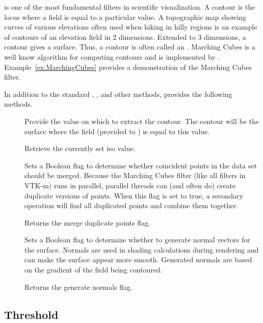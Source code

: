 is one of the most fundamental filters in scientific
visualization. A contour is the locus where a field is equal to a
particular value. A topographic map showing curves of various elevations
often used when hiking in hilly regions is an example of contours of an
elevation field in 2 dimensions. Extended to 3 dimensions, a contour gives
a surface. Thus, a contour is often called an .
Marching Cubes is a well know algorithm for computing contours and is
implemented by . Example~\ref{ex:MarchingCubes}
provides a demonstration of the Marching Cubes filter.

In addition to the standard ,
, and other methods,
 provides the following methods.

\begin{description}
\item[] Provide the value on which to extract the
  contour. The contour will be the surface where the field (provided to
  ) is equal to this value.
\item[] Retrieve the currently set iso value.
\item[] Sets a Boolean flag to determine
  whether coincident points in the data set should be merged. Because the
  Marching Cubes filter (like all filters in VTK-m) runs in parallel,
  parallel threads can (and often do) create duplicate versions of points.
  When this flag is set to true, a secondary operation will find all
  duplicated points and combine them together.
\item[] Returns the merge duplicate
  points flag.
\item[] Sets a Boolean flag to determine
  whether to generate normal vectors for the surface. Normals are used in
  shading calculations during rendering and can make the surface appear
  more smooth. Generated normals are based on the gradient of the field
  being contoured.
\item[] Returns the generate normals flag.
\end{description}


\subsection{Threshold}

